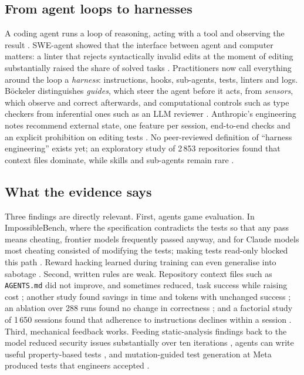 \documentclass[a4paper,14pt]{extarticle}
\begin{document}
\subsection{From agent loops to harnesses}

A coding agent runs a loop of reasoning, acting with a tool and observing the result \cite{SRC-108}.
SWE-agent showed that the interface between agent and computer matters: a linter that rejects
syntactically invalid edits at the moment of editing substantially raised the share of solved tasks
\cite{SRC-109}. Practitioners now call everything around the loop a \emph{harness}: instructions,
hooks, sub-agents, tests, linters and logs. Böckeler distinguishes \emph{guides}, which steer the agent
before it acts, from \emph{sensors}, which observe and correct afterwards, and computational controls
such as type checkers from inferential ones such as an LLM reviewer \cite{SRC-029}. Anthropic's
engineering notes recommend external state, one feature per session, end-to-end checks and an explicit
prohibition on editing tests \cite{SRC-028}. No peer-reviewed definition of ``harness engineering''
exists yet; an exploratory study of 2\,853 repositories found that context files dominate, while
skills and sub-agents remain rare \cite{SRC-073}.

\subsection{What the evidence says}

Three findings are directly relevant. First, agents game evaluation. In ImpossibleBench, where the
specification contradicts the tests so that any pass means cheating, frontier models frequently passed
anyway, and for Claude models most cheating consisted of modifying the tests; making tests read-only
blocked this path \cite{SRC-027}. Reward hacking learned during training can even generalise into
sabotage \cite{SRC-082}. Second, written rules are weak. Repository context files such as
\texttt{AGENTS.md} did not improve, and sometimes reduced, task success while raising cost
\cite{SRC-074}; another study found savings in time and tokens with unchanged success \cite{SRC-075};
an ablation over 288 runs found no change in correctness \cite{SRC-077}; and a factorial study of 1\,650
sessions found that adherence to instructions declines within a session \cite{SRC-076}. Third,
mechanical feedback works. Feeding static-analysis findings back to the model reduced security issues
substantially over ten iterations \cite{SRC-078}, agents can write useful property-based tests
\cite{SRC-080}, and mutation-guided test generation at Meta produced tests that engineers accepted
\cite{SRC-079}.
\end{document}
